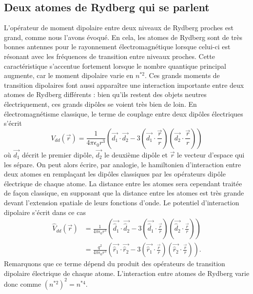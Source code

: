 	\subsection{Deux atomes de Rydberg qui se parlent}
L'opérateur de moment dipolaire entre deux niveaux de Rydberg proches est grand, comme nous l'avons évoqué.
En cela, les atomes de Rydberg sont de très bonnes antennes pour le rayonnement électromagnétique lorsque celui-ci est résonant avec les fréquences de transition entre niveaux proches.
Cette caractéristique s'accentue fortement lorsque le nombre quantique principal augmente, car le moment dipolaire varie en $n^{*2}$.
Ces grands moments de transition dipolaires font aussi apparaître une interaction importante entre deux atomes de Rydberg différents : bien qu'ils restent des objets neutres électriquement, ces grands dipôles se voient très bien de loin.
En électromagnétisme classique, le terme de couplage entre deux dipôles électriques s'écrit \cite{TXT_JACKSON}
\begin{equation}\label{eq:classicDipole}
V_{dd}(\vec{r}) = \frac{1}{4\pi\epsilon_0 r^3} \left( \vec{d_1}\cdot \vec{d_2} - 3(\vec{d_1}\cdot \frac{\vec{r}}{r})(\vec{d_2}\cdot\frac{\vec{r}}{r}) \right)
\end{equation}
où $\vec{d_1}$ décrit le premier dipôle, $\vec{d_2}$ le deuxième dipôle et $\vec{r}$ le vecteur d'espace qui les sépare.
On peut alors écrire, par analogie, le hamiltonien d'interaction entre deux atomes en remplaçant les dipôles classiques par les opérateurs dipôle électrique de chaque atome.
La distance entre les atomes sera cependant traitée de façon classique, en supposant que la distance entre les atomes est très grande devant l'extension spatiale de leurs fonctions d'onde.
Le potentiel d'interaction dipolaire s'écrit dans ce cas
\begin{equation}\label{eq:quantDipole}
\begin{aligned}
\hat{V}_{dd}(\vec{r}) &= \frac{1}{4\pi\epsilon_0 r^3} \left( \vec{\hat{d}_1}\cdot \vec{\hat{d}_2} - 3(\vec{\hat{d}_1}\cdot \frac{\vec{r}}{r})(\vec{\hat{d}_2}\cdot\frac{\vec{r}}{r}) \right) \\
&= \frac{q^2}{4\pi\epsilon_0 r^3} \left( \vec{\hat{r}_1}\cdot \vec{\hat{r}_2} - 3(\vec{\hat{r}_1}\cdot \frac{\vec{r}}{r})(\vec{\hat{r}_2}\cdot\frac{\vec{r}}{r}) \right).
\end{aligned}
\end{equation}
%
Remarquons que ce terme dépend du produit des opérateurs de transition dipolaire électrique de chaque atome. L'interaction entre atomes de Rydberg varie donc comme $(n^{*2})^2 = n^{*4}$. 

